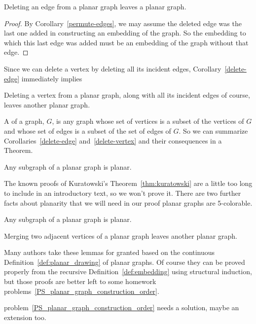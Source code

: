 \begin{editingnotes}
\begin{corollary}\label{delete-edge}
Deleting an edge from a planar graph leaves a planar graph.

\begin{proof}
  By Corollary~\ref{permute-edges}, we may assume the deleted edge was the
  last one added in constructing an embedding of the graph.  So the
  embedding to which this last edge was added must be an embedding of the
  graph without that edge.
\end{proof}

\end{corollary}

Since we can delete a vertex by deleting all its incident edges,
Corollary~\ref{delete-edge} immediately implies

\begin{corollary}\label{delete-vertex}
Deleting a vertex from a planar graph, along with all its incident
edges of course, leaves another planar graph.
\end{corollary}

A  of a graph, $G$, is any graph whose set of vertices is a
subset of the vertices of $G$ and whose set of edges is a subset of the
set of edges of $G$.  So we can summarize Corollaries~\ref{delete-edge}
and~\ref{delete-vertex} and their consequences in a Theorem.

\begin{theorem}\label{planar-subgraph}
  Any subgraph of a planar graph is planar.
\end{theorem}

\end{editingnotes}

The known proofs of Kuratowski's Theorem~\ref{thm:kuratowski} are a little
too long to include in an introductory text, so we won't prove it.  There
are two further facts about planarity that we will need in our proof
planar graphs are 5-colorable.

\begin{lemma}\label{planar-subgraph}
  Any subgraph of a planar graph is planar.
\end{lemma}

\begin{lemma}\label{mergelem}
Merging two adjacent vertices of a planar graph leaves another planar
graph.
\end{lemma}

Many authors take these lemmas for granted based on the continuous
Definition~\ref{def:planar_drawing} of planar graphs.  Of course they can
be proved properly from the recursive Definition~\ref{def:embedding} using
structural induction, but those proofs are better left to some homework
problems~\ref{PS_planar_graph_construction_order}.
\begin{editingnotes}
problem~\ref{PS_planar_graph_construction_order} needs a solution, maybe
an extension too.
\end{editingnotes}


